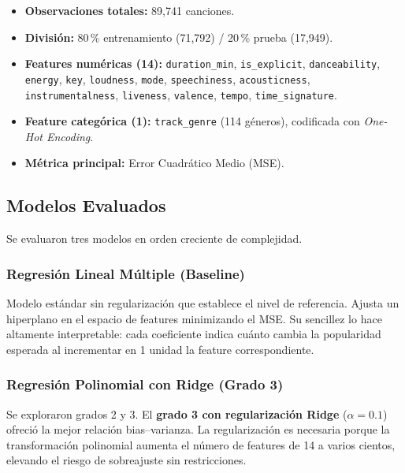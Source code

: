 \documentclass[12pt,a4paper]{article}
\begin{document}
\begin{itemize}[noitemsep]
  \item \textbf{Observaciones totales:} 89{,}741 canciones.
  \item \textbf{Divisi\'on:} 80\,\% entrenamiento (71{,}792) / 20\,\% prueba (17{,}949).
  \item \textbf{Features num\'ericas (14):} \texttt{duration\_min}, \texttt{is\_explicit},
    \texttt{danceability}, \texttt{energy}, \texttt{key}, \texttt{loudness}, \texttt{mode},
    \texttt{speechiness}, \texttt{acousticness}, \texttt{instrumentalness},
    \texttt{liveness}, \texttt{valence}, \texttt{tempo}, \texttt{time\_signature}.
  \item \textbf{Feature categ\'orica (1):} \texttt{track\_genre} (114 g\'eneros),
    codificada con \textit{One-Hot Encoding}.
  \item \textbf{M\'etrica principal:} Error Cuadr\'atico Medio (MSE).
\end{itemize}

\subsection{Modelos Evaluados}

Se evaluaron tres modelos en orden creciente de complejidad.

\subsubsection{Regresi\'on Lineal M\'ultiple (Baseline)}

Modelo est\'andar sin regularizaci\'on que establece el nivel de referencia.
Ajusta un hiperplano en el espacio de features minimizando el MSE.
Su sencillez lo hace altamente interpretable: cada coeficiente indica cu\'anto
cambia la popularidad esperada al incrementar en 1 unidad la feature correspondiente.

\subsubsection{Regresi\'on Polinomial con Ridge (Grado 3)}

Se exploraron grados 2 y 3. El \textbf{grado 3 con regularizaci\'on Ridge}
($\alpha = 0.1$) ofreci\'o la mejor relaci\'on bias--varianza. La regularizaci\'on
es necesaria porque la transformaci\'on polinomial aumenta el n\'umero de features
de 14 a varios cientos, elevando el riesgo de sobreajuste sin restricciones.
\end{document}
